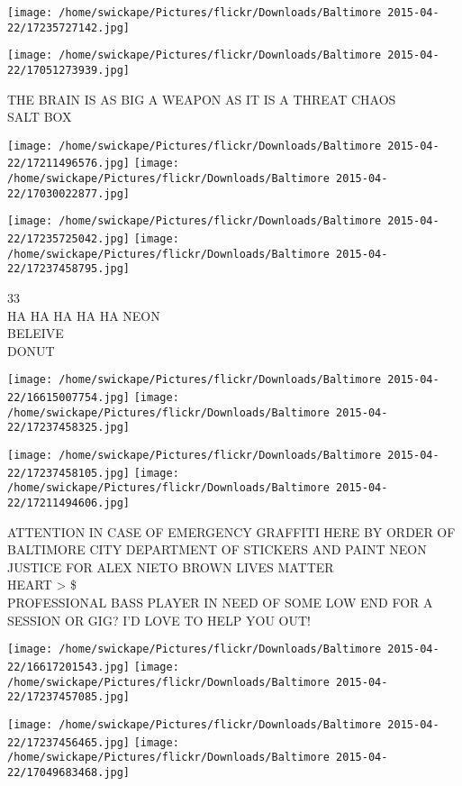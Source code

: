 \documentclass[10pt,letterpaper]{article}
\begin{document}
\texttt{[image: /home/swickape/Pictures/flickr/Downloads/Baltimore 2015-04-22/17235727142.jpg]}

\vspace{0.25in}
\texttt{[image: /home/swickape/Pictures/flickr/Downloads/Baltimore 2015-04-22/17051273939.jpg]}

THE BRAIN IS AS BIG A WEAPON AS IT IS A THREAT CHAOS\\
SALT BOX
\pagebreak

\texttt{[image: /home/swickape/Pictures/flickr/Downloads/Baltimore 2015-04-22/17211496576.jpg]}
\texttt{[image: /home/swickape/Pictures/flickr/Downloads/Baltimore 2015-04-22/17030022877.jpg]}

\texttt{[image: /home/swickape/Pictures/flickr/Downloads/Baltimore 2015-04-22/17235725042.jpg]}
\texttt{[image: /home/swickape/Pictures/flickr/Downloads/Baltimore 2015-04-22/17237458795.jpg]}

33\\
HA HA HA HA HA NEON\\
BELEIVE\\
DONUT
\pagebreak

\texttt{[image: /home/swickape/Pictures/flickr/Downloads/Baltimore 2015-04-22/16615007754.jpg]}
\texttt{[image: /home/swickape/Pictures/flickr/Downloads/Baltimore 2015-04-22/17237458325.jpg]}

\texttt{[image: /home/swickape/Pictures/flickr/Downloads/Baltimore 2015-04-22/17237458105.jpg]}
\texttt{[image: /home/swickape/Pictures/flickr/Downloads/Baltimore 2015-04-22/17211494606.jpg]}

ATTENTION IN CASE OF EMERGENCY GRAFFITI HERE BY ORDER OF BALTIMORE CITY DEPARTMENT OF STICKERS AND PAINT NEON\\
JUSTICE FOR ALEX NIETO BROWN LIVES MATTER\\
HEART > \$\\
PROFESSIONAL BASS PLAYER IN NEED OF SOME LOW END FOR A SESSION OR GIG?  I'D LOVE TO HELP YOU OUT!
\pagebreak

\texttt{[image: /home/swickape/Pictures/flickr/Downloads/Baltimore 2015-04-22/16617201543.jpg]}
\texttt{[image: /home/swickape/Pictures/flickr/Downloads/Baltimore 2015-04-22/17237457085.jpg]}

\texttt{[image: /home/swickape/Pictures/flickr/Downloads/Baltimore 2015-04-22/17237456465.jpg]}
\texttt{[image: /home/swickape/Pictures/flickr/Downloads/Baltimore 2015-04-22/17049683468.jpg]}
\end{document}

